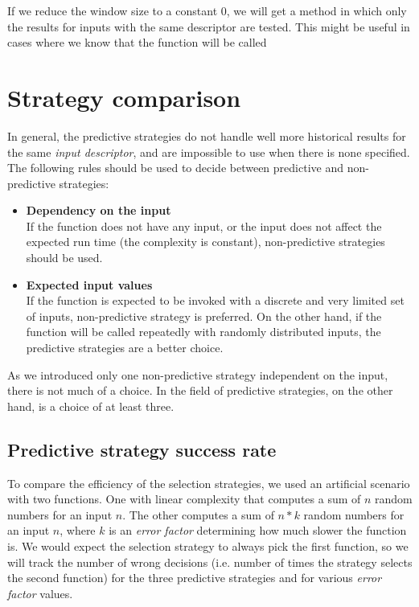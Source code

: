 If we reduce the window size to a constant 0, we will get a method in which only the results for inputs with the same descriptor are tested. This might be useful in cases where we know that the function will be called 

\section{Strategy comparison}
\label{sec:strategy_comparison}

In general, the predictive strategies do not handle well more historical results for the same \textit{input descriptor}, and are impossible to use when there is none specified. The following rules should be used to decide between predictive and non-predictive strategies:

\begin{itemize}
	\item \textbf{Dependency on the input} \\
	If the function does not have any input, or the input does not affect the expected run time (the complexity is constant), non-predictive strategies should be used.
	\item \textbf{Expected input values} \\
	If the function is expected to be invoked with a discrete and very limited set of inputs, non-predictive strategy is preferred. On the other hand, if the function will be called repeatedly with randomly distributed inputs, the predictive strategies are a better choice.
\end{itemize}

As we introduced only one non-predictive strategy independent on the input, there is not much of a choice. In the field of predictive strategies, on the other hand, is a choice of at least three.

\subsection{Predictive strategy success rate}

To compare the efficiency of the selection strategies, we used an artificial scenario with two functions. One with linear complexity that computes a sum of $n$ random numbers for an input $n$. The other computes a sum of $n * k$ random numbers for an input $n$, where $k$ is an \textit{error factor} determining how much slower the function is. We would expect the selection strategy to always pick the first function, so we will track the number of wrong decisions (i.e. number of times the strategy selects the second function) for the three predictive strategies and for various \textit{error factor} values.

